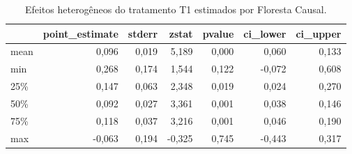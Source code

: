 \begin{table}
\centering
\caption{Efeitos heterogêneos do tratamento T1 estimados por Floresta Causal.}
\label{tab:cf-summary}
\begin{tabular}{lrrrrrr}
\toprule
{} &  point\_estimate &  stderr &  zstat &  pvalue &  ci\_lower &  ci\_upper \\
\midrule
mean &           0,096 &   0,019 &  5,189 &   0,000 &     0,060 &     0,133 \\
min  &           0,268 &   0,174 &  1,544 &   0,122 &    -0,072 &     0,608 \\
25\%  &           0,147 &   0,063 &  2,348 &   0,019 &     0,024 &     0,270 \\
50\%  &           0,092 &   0,027 &  3,361 &   0,001 &     0,038 &     0,146 \\
75\%  &           0,118 &   0,037 &  3,216 &   0,001 &     0,046 &     0,190 \\
max  &          -0,063 &   0,194 & -0,325 &   0,745 &    -0,443 &     0,317 \\
\bottomrule
\end{tabular}
\end{table}
